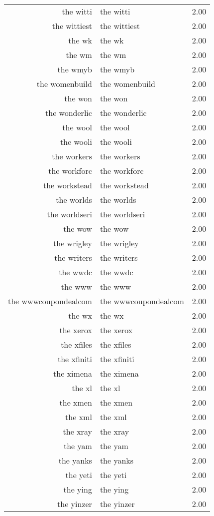 \begin{table}[ht]
\begin{tabular}{rlr}
  the witti & the witti & 2.00 \\ 
  the wittiest & the wittiest & 2.00 \\ 
  the wk & the wk & 2.00 \\ 
  the wm & the wm & 2.00 \\ 
  the wmyb & the wmyb & 2.00 \\ 
  the womenbuild & the womenbuild & 2.00 \\ 
  the won & the won & 2.00 \\ 
  the wonderlic & the wonderlic & 2.00 \\ 
  the wool & the wool & 2.00 \\ 
  the wooli & the wooli & 2.00 \\ 
  the workers & the workers & 2.00 \\ 
  the workforc & the workforc & 2.00 \\ 
  the workstead & the workstead & 2.00 \\ 
  the worlds & the worlds & 2.00 \\ 
  the worldseri & the worldseri & 2.00 \\ 
  the wow & the wow & 2.00 \\ 
  the wrigley & the wrigley & 2.00 \\ 
  the writers & the writers & 2.00 \\ 
  the wwdc & the wwdc & 2.00 \\ 
  the www & the www & 2.00 \\ 
  the wwwcoupondealcom & the wwwcoupondealcom & 2.00 \\ 
  the wx & the wx & 2.00 \\ 
  the xerox & the xerox & 2.00 \\ 
  the xfiles & the xfiles & 2.00 \\ 
  the xfiniti & the xfiniti & 2.00 \\ 
  the ximena & the ximena & 2.00 \\ 
  the xl & the xl & 2.00 \\ 
  the xmen & the xmen & 2.00 \\ 
  the xml & the xml & 2.00 \\ 
  the xray & the xray & 2.00 \\ 
  the yam & the yam & 2.00 \\ 
  the yanks & the yanks & 2.00 \\ 
  the yeti & the yeti & 2.00 \\ 
  the ying & the ying & 2.00 \\ 
  the yinzer & the yinzer & 2.00 \\ 

\end{tabular}
\end{table}
